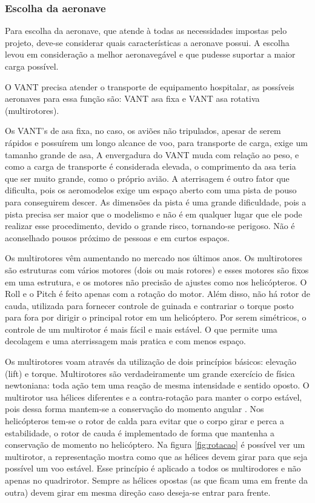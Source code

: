 \subsubsection{Escolha da aeronave}

Para escolha da aeronave, que atende à todas as necessidades impostas pelo projeto, deve-se considerar quais características a aeronave possui. A escolha levou em consideração a melhor aeronavegável e que pudesse suportar a maior carga possível.

O VANT precisa atender o transporte de equipamento hospitalar, as possíveis aeronaves para essa função são: VANT asa fixa e VANT asa rotativa (multirotores).

Os VANT’s de asa fixa, no caso, os aviões não tripulados, apesar de serem rápidos e possuírem um longo alcance de voo, para transporte de carga, exige um tamanho grande de asa, A envergadura do VANT muda com relação ao peso, e como a carga de transporte é considerada elevada, o comprimento da asa teria que ser muito grande, como o próprio avião. A aterrisagem é outro fator que dificulta, pois os aeromodelos exige um espaço aberto com uma pista de pouso para conseguirem descer. As dimensões da pista é uma grande dificuldade, pois a pista precisa ser maior que o modelismo e não é em qualquer lugar que ele pode realizar esse procedimento, devido o grande risco, tornando-se perigoso. Não é aconselhado pousos próximo de pessoas e em curtos espaços.

Os multirotores vêm aumentando no mercado nos últimos anos. Os multirotores são estruturas com vários motores (dois ou mais rotores) e esses motores são fixos em uma estrutura, e os motores não precisão de ajustes como nos helicópteros. O Roll e o Pitch é feito apenas com a rotação do motor. Além disso, não há rotor de cauda, utilizada para fornecer controle de guinada e contrariar o torque posto para fora por dirigir o principal rotor em um helicóptero. Por serem simétricos, o controle de um multirotor é mais fácil e mais estável. O que permite uma decolagem e uma aterrissagem mais pratica e com menos espaço.

Os multirotores voam através da utilização de dois princípios básicos: elevação (lift) e torque. Multirotores são verdadeiramente um grande exercício de física newtoniana: toda ação tem uma reação de mesma intensidade e sentido oposto. O multirotor usa  hélices diferentes e a contra-rotação para  manter o corpo  estável, pois dessa forma mantem-se a conservação do momento angular \cite{audronis}. Nos helicópteros tem-se o rotor de calda para evitar que o corpo girar e perca a estabilidade, o rotor de cauda é implementado de forma que mantenha a conservação de momento no helicóptero. 
Na figura \ref{fig:rotacao} é possível ver um multirotor, a representação mostra como que as hélices devem girar para que seja possível um voo estável. Esse princípio é aplicado a todos os multirodores e não apenas no quadrirotor. Sempre as hélices opostas (as que ficam uma em frente da outra) devem girar em mesma direção caso deseja-se entrar para frente.


